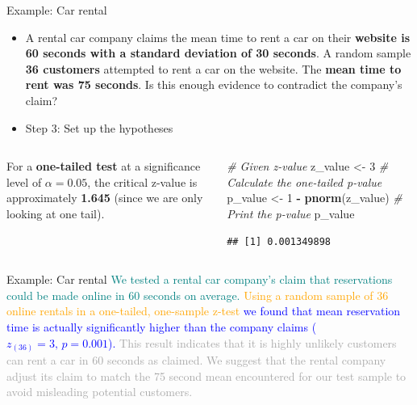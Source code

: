 \documentclass[
  ignorenonframetext,
]{beamer}
\newenvironment{Shaded}{\begin{snugshade}}{\end{snugshade}}
\newcommand{\CommentTok}[1]{\textcolor[rgb]{0.56,0.35,0.01}{\textit{#1}}}
\newcommand{\DecValTok}[1]{\textcolor[rgb]{0.00,0.00,0.81}{#1}}
\newcommand{\FunctionTok}[1]{\textcolor[rgb]{0.13,0.29,0.53}{\textbf{#1}}}
\newcommand{\NormalTok}[1]{#1}
\newcommand{\OtherTok}[1]{\textcolor[rgb]{0.56,0.35,0.01}{#1}}
\newcommand{\SpecialCharTok}[1]{\textcolor[rgb]{0.81,0.36,0.00}{\textbf{#1}}}
\begin{document}
\begin{frame}[fragile]{Example: Car rental}
\label{example-car-rental-4}
\begin{itemize}
\item
  A rental car company claims the mean time to rent a car on their
  \textbf{website is 60 seconds with a standard deviation of 30
  seconds}. A random sample \textbf{36 customers} attempted to rent a
  car on the website. The \textbf{mean time to rent was 75 seconds}. Is
  this enough evidence to contradict the company's claim? \vspace{0.5cm}
\item
  Step 3: Set up the hypotheses
\end{itemize}

\begin{columns}[T]
\begin{column}{0.4\textwidth}
For a \textbf{one-tailed test} at a significance level of
\textbf{\(\alpha = 0.05\)}, the critical z-value is approximately
\textbf{1.645} (since we are only looking at one tail).
\end{column}

\begin{column}{0.6\textwidth}
\begin{Shaded}
\begin{Highlighting}[]
\CommentTok{\# Given z{-}value}
\NormalTok{z\_value }\OtherTok{\textless{}{-}} \DecValTok{3}
\CommentTok{\# Calculate the one{-}tailed p{-}value}
\NormalTok{p\_value }\OtherTok{\textless{}{-}} \DecValTok{1} \SpecialCharTok{{-}} \FunctionTok{pnorm}\NormalTok{(z\_value)}
\CommentTok{\# Print the p{-}value}
\NormalTok{p\_value}
\end{Highlighting}
\end{Shaded}

\begin{verbatim}
## [1] 0.001349898
\end{verbatim}
\end{column}
\end{columns}
\end{frame}

\begin{frame}{Example: Car rental}
\label{example-car-rental-5}
\textcolor{teal}{We tested a rental car company's claim that reservations could be made online in 60 seconds on average.}
\textcolor{orange}{ Using a random sample of 36 online rentals in a one-tailed, one-sample z-test}
\textcolor{blue}{ we found that mean reservation time is actually significantly higher than the company claims (\( z_{(36)}=3, \, p=0.001 \)).}
\textcolor{darkgray}{  This result indicates that it is highly unlikely customers can rent a car in 60 seconds as claimed.  We suggest that the rental company adjust its claim to match the 75 second mean encountered for our test sample to avoid misleading potential customers.}
\end{frame}
\end{document}
